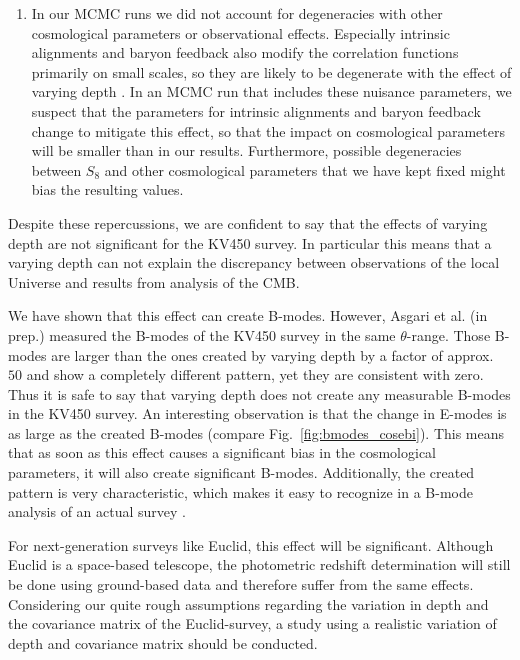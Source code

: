 \documentclass{aa}
\begin{document}
\begin{enumerate}
\item In our MCMC runs we did not account for degeneracies with other cosmological parameters or observational effects. Especially intrinsic alignments and baryon feedback also modify the correlation functions primarily on small scales, so they are likely to be degenerate with the effect of varying depth \citep{Troxel:2015}. In an MCMC run that includes these nuisance parameters, we suspect that the parameters for intrinsic alignments and baryon feedback change to mitigate this effect, so that the impact on cosmological parameters will be smaller than in our results. Furthermore, possible degeneracies between $S_8$ and other cosmological parameters that we have kept fixed might bias the resulting values. %
\end{enumerate}

Despite these repercussions, we are confident to say that the effects of varying depth are not significant for the KV450 survey. In particular this means that a varying depth can not explain the discrepancy between observations of the local Universe and results from analysis of the CMB.

We have shown that this effect can create B-modes. However, Asgari et al. (in prep.) measured the B-modes of the KV450 survey in the same $\theta$-range. Those B-modes are larger than the ones created by varying depth by a factor of approx.~$50$ and show a completely different pattern, yet they are consistent with zero. Thus it is safe to say that varying depth does not create any measurable B-modes in the KV450 survey. An interesting observation is that the change in E-modes is as large as the created B-modes (compare Fig.~\ref{fig:bmodes_cosebi}). This means that as soon as this effect causes a significant bias in the cosmological parameters, it will also create significant B-modes. Additionally, the created pattern is very characteristic, which makes it easy to recognize in a B-mode analysis of an actual survey \citep[see][]{2018arXiv181002353A}.

For next-generation surveys like Euclid, this effect will be significant. Although Euclid is a space-based telescope, the photometric redshift determination will still be done using ground-based data and therefore suffer from the same effects. Considering our quite rough assumptions regarding the variation in depth and the covariance matrix of the Euclid-survey, a study using a realistic variation of depth and covariance matrix should be conducted.
\end{document}
